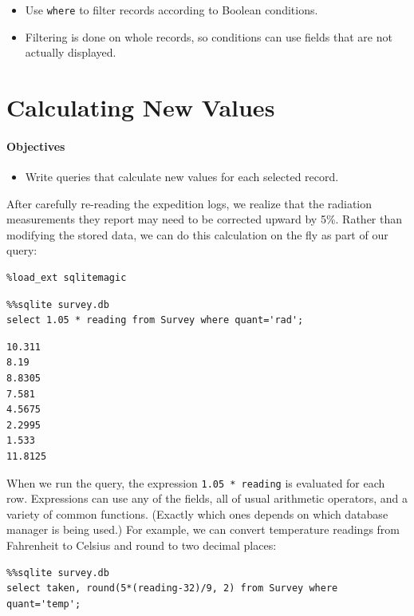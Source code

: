 \documentclass[]{book}
\begin{document}
\begin{itemize}
\item
  Use \texttt{where} to filter records according to Boolean conditions.
\item
  Filtering is done on whole records, so conditions can use fields that
  are not actually displayed.
\end{itemize}

\section{Calculating New Values}

\mbox{}\paragraph{Objectives}

\begin{itemize}
\item
  Write queries that calculate new values for each selected record.
\end{itemize}

After carefully re-reading the expedition logs, we realize that the
radiation measurements they report may need to be corrected upward by
5\%. Rather than modifying the stored data, we can do this calculation
on the fly as part of our query:

\begin{verbatim}
%load_ext sqlitemagic
\end{verbatim}

\begin{verbatim}
%%sqlite survey.db
select 1.05 * reading from Survey where quant='rad';
\end{verbatim}

\begin{verbatim}
10.311
8.19
8.8305
7.581
4.5675
2.2995
1.533
11.8125
\end{verbatim}

When we run the query, the expression \texttt{1.05 * reading} is
evaluated for each row. Expressions can use any of the fields, all of
usual arithmetic operators, and a variety of common functions. (Exactly
which ones depends on which database manager is being used.) For
example, we can convert temperature readings from Fahrenheit to Celsius
and round to two decimal places:

\begin{verbatim}
%%sqlite survey.db
select taken, round(5*(reading-32)/9, 2) from Survey where quant='temp';
\end{verbatim}
\end{document}
